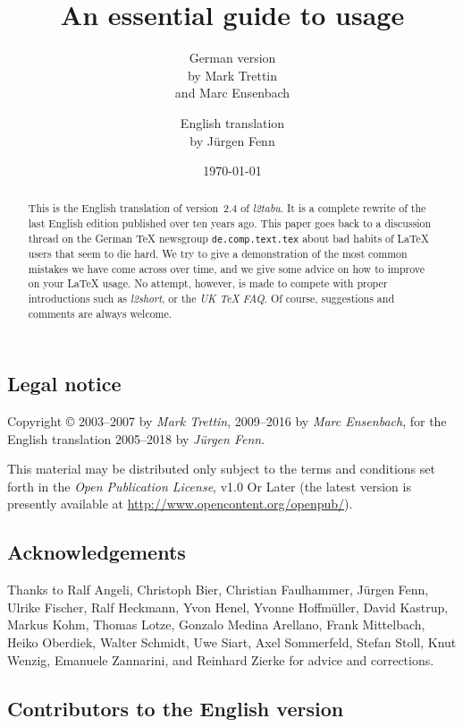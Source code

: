 \documentclass[abstract=on, singlepage=on, paper=a4]{scrartcl}
\title{An essential guide to \LaTeXe{} usage}
\author{German version\\
  by Mark Trettin\\and Marc Ensenbach
  \and{}
  English translation\\
  by Jürgen Fenn
}
\date{\today}
\newcommand{\Author}[1]{\emph{#1}}
\newcommand{\Doku}[1]{\emph{#1}}
\newcommand{\Legal}[1]{\emph{#1}}
\begin{document}
\pagestyle{headings}
\maketitle
\begin{abstract}
  \noindent This is the English translation of version~2.4 of
  \Doku{l2tabu}. It is a complete rewrite of the last English edition
  published over ten years ago. This paper goes back to a discussion
  thread on the German \TeX{} newsgroup \texttt{de.comp.text.tex}
  about bad habits of \LaTeX{} users that seem to die hard. We try to
  give a demonstration of the most common mistakes we have come across
  over time, and we give some advice on how to improve on your
  \LaTeX{} usage. No attempt, however, is made to compete with proper
  introductions such as \Doku{l2short}, or the \Doku{UK \TeX{}
    FAQ}. Of course, suggestions and comments are always welcome.
\end{abstract}

\subsection*{Legal notice}
\label{sec:legal-notice}

Copyright \copyright{} 2003--2007 by \Author{Mark Trettin}, 2009--2016
by \Author{Marc Ensenbach}, for the English translation 2005--2018 by
\Author{Jürgen Fenn}.

\medskip\noindent
This material may be distributed only subject to the terms
and conditions set forth in the \Legal{Open Publication License}, v1.0
Or Later (the latest version is presently available at
\url{http://www.opencontent.org/openpub/}).

\subsection*{Acknowledgements}
\label{sec:acknowledgements}

Thanks to Ralf Angeli, Christoph Bier, Christian Faulhammer, Jürgen
Fenn, Ulrike Fischer, Ralf Heckmann, Yvon Henel, Yvonne Hoffmüller,
David Kastrup, Markus Kohm, Thomas Lotze, Gonzalo Medina Arellano,
Frank Mittelbach, Heiko Oberdiek, Walter Schmidt, Uwe Siart, Axel
Sommerfeld, Stefan Stoll, Knut Wenzig, Emanuele Zannarini, and
Reinhard Zierke for advice and corrections. 

\subsection*{Contributors to the English version}
\label{sec:contr-engl-vers}
\end{document}
